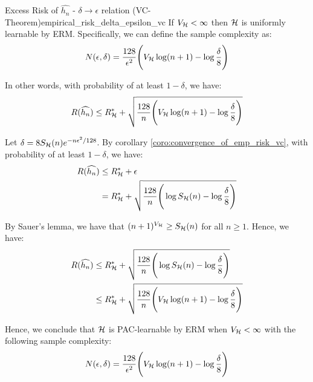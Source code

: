 \begin{corollary}{Excess Risk of $\widehat{h_n}$ - $\delta\to\epsilon$ relation (VC-Theorem)}{empirical_risk_delta_epsilon_vc}
    If $V_{\mathcal{H}} <\infty$ then $\mathcal{H}$ is uniformly learnable by ERM. Specifically, we can define the sample complexity as:
    \begin{align*}
        N(\epsilon, \delta) = \frac{128}{\epsilon^2}\Bigg( 
            V_{\mathcal{H}} \log(n+1) - \log\frac{\delta}{8}
         \Bigg)
    \end{align*}

    \noindent In other words, with probability of at least $1-\delta$, we have:
    \begin{align*}
        R(\widehat{h_n}) \le R_{\mathcal{H}}^* + \sqrt{
            \frac{128}{n}\Bigg( 
                V_{\mathcal{H}}\log(n+1) - \log\frac{\delta}{8}
             \Bigg)
        }
    \end{align*}
\end{corollary}

\begin{proof*}
    Let $\delta = 8S_{\mathcal{H}}(n)e^{-n\epsilon^2/128}$. By corollary \ref{coro:convergence_of_emp_risk_vc}, with probability of at least $1-\delta$, we have:
    \begin{align*}
        R(\widehat{h_n}) &\le R_{\mathcal{H}}^* + \epsilon \\
        &= R_{\mathcal{H}}^* + \sqrt{
            \frac{128}{n}\Bigg( 
                \log S_{\mathcal{H}}(n) - \log\frac{\delta}{8}
             \Bigg)
        }
    \end{align*}

    \noindent By Sauer's lemma, we have that $(n+1)^{V_{\mathcal{H}}}\ge S_{\mathcal{H}}(n)$ for all $n\ge 1$. Hence, we have:
    \begin{align*}
        R(\widehat{h_n}) &\le R_{\mathcal{H}}^* + \sqrt{
            \frac{128}{n}\Bigg( 
                \log S_{\mathcal{H}}(n) - \log\frac{\delta}{8}
             \Bigg)
        } \\
        &\le R_{\mathcal{H}}^* + \sqrt{
            \frac{128}{n}\Bigg( 
                V_{\mathcal{H}}\log(n+1) - \log\frac{\delta}{8}
             \Bigg)
        }
    \end{align*}

    \noindent\newline Hence, we conclude that $\mathcal{H}$ is PAC-learnable by ERM when $V_{\mathcal{H}}<\infty$ with the following sample complexity:
    \begin{align*}
        N(\epsilon, \delta) = \frac{128}{\epsilon^2}\Bigg( 
            V_{\mathcal{H}} \log(n+1) - \log\frac{\delta}{8}
         \Bigg)
    \end{align*}
\end{proof*}


